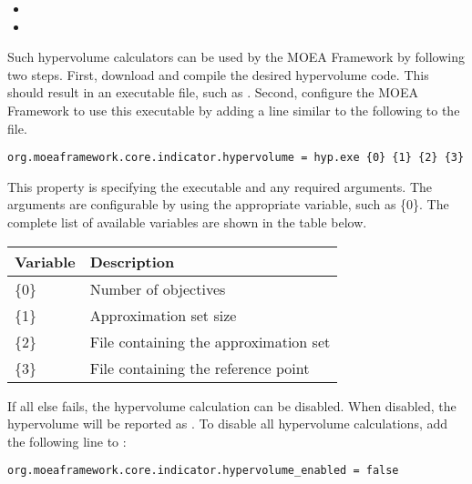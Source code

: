 \begin{itemize}
  \item {}
  \item {}
\end{itemize}

Such hypervolume calculators can be used by the MOEA Framework by following two steps.  First, download and compile the desired hypervolume code.  This should result in an executable file, such as .  Second, configure the MOEA Framework to use this executable by adding a line similar to the following to the  file.

\begin{lstlisting}[language=Plaintext]
org.moeaframework.core.indicator.hypervolume = hyp.exe {0} {1} {2} {3}
\end{lstlisting}

This property is specifying the executable and any required arguments.  The arguments are configurable by using the appropriate variable, such as \{0\}.  The complete list of available variables are shown in the table below.

\begin{center}
\begin{tabular}{ll}
  Variable & Description \\
  \hline
  \{0\} & Number of objectives \\
  \{1\} & Approximation set size \\
  \{2\} & File containing the approximation set \\
  \{3\} & File containing the reference point
\end{tabular}
\end{center}

If all else fails, the hypervolume calculation can be disabled.  When disabled, the hypervolume will be reported as .  To disable all hypervolume calculations, add the following line to :

\begin{lstlisting}[language=Plaintext]
org.moeaframework.core.indicator.hypervolume_enabled = false
\end{lstlisting}
